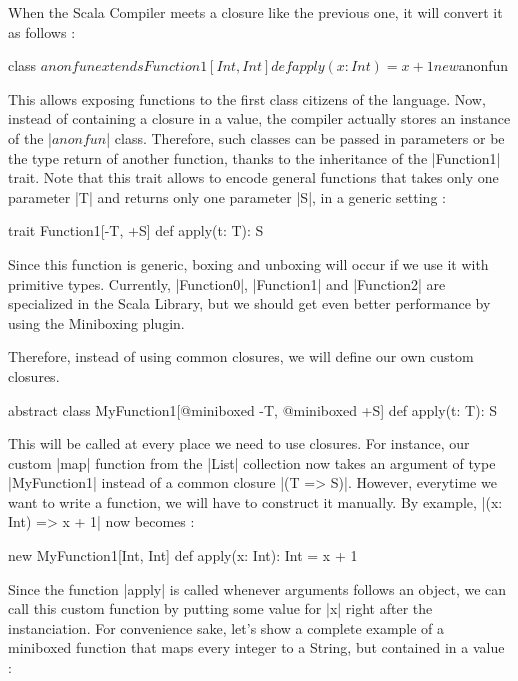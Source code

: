 When the Scala Compiler meets a closure like the previous one, it will convert it as follows :

\begin{lstlisting-nobreak}
 {
  class $anonfun extends Function1[Int, Int] {
    def apply(x: Int) = x + 1
  }
  
  new $anonfun
 }
\end{lstlisting-nobreak}

This allows exposing functions to the first class citizens of the language. Now, instead of containing a closure in a value, the compiler actually stores an instance of the |$anonfun$| class. Therefore, such classes can be passed in parameters or be the type return of another function, thanks to the inheritance of the |Function1| trait. Note that this trait allows to encode general functions that takes only one parameter |T| and returns only one parameter |S|, in a generic setting :

\begin{lstlisting-nobreak}
 trait Function1[-T, +S] {
   def apply(t: T): S
 }
\end{lstlisting-nobreak}

Since this function is generic, boxing and unboxing will occur if we use it with primitive types. Currently, |Function0|, |Function1| and |Function2| are specialized in the Scala Library, but we should get even better performance by using the Miniboxing plugin.

Therefore, instead of using common closures, we will define our own custom closures. 

\begin{lstlisting-nobreak}
 abstract class MyFunction1[@miniboxed -T, @miniboxed +S] {
   def apply(t: T): S
 }
\end{lstlisting-nobreak}

This will be called at every place we need to use closures. For instance, our custom |map| function from the |List| collection now takes an argument of type |MyFunction1| instead of a common closure |(T => S)|. However, everytime we want to write a function, we will have to construct it manually. By example, |(x: Int) => x + 1| now becomes :

\begin{lstlisting-nobreak}
 new MyFunction1[Int, Int] {
   def apply(x: Int): Int = x + 1
 }
\end{lstlisting-nobreak}

Since the function |apply| is called whenever arguments follows an object, we can call this custom function by putting some value for |x| right after the instanciation. For convenience sake, let's show a complete example of a miniboxed function that maps every integer to a String, but contained in a value :

